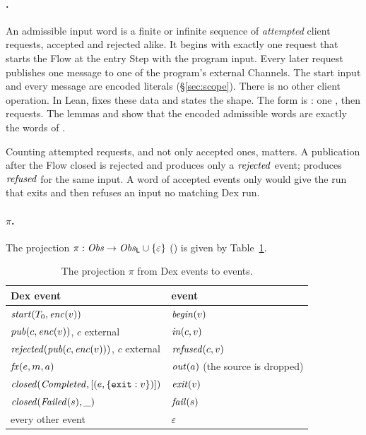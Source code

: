 \paragraph{\Eadm.}
An admissible input word is a finite or infinite sequence of
\emph{attempted} client requests, accepted and rejected alike. It begins
with exactly one request that starts the Flow at the entry Step with the
program input. Every later request publishes one message to one of the
program's external Channels. The start input and every message are encoded
\Lang{} literals (\S\ref{sec:scope}). There is no other client operation.
In Lean,  fixes these data and
 states the shape. The \Lang{} form
is : one , then  requests.
The lemmas  and 
show that the encoded admissible \Lang{} words are exactly the words of
\Eadm.

Counting attempted requests, and not only accepted ones, matters. A
publication after the Flow closed is rejected and produces only a
$\mathit{rejected}$ event; \Lang{} produces $\mathit{refused}$ for the same input.
A word of accepted events only would give the \Lang{} run that exits and
then refuses an input no matching Dex run.

\paragraph{$\pi$.}
The projection $\pi : \mathit{Obs} \to \mathit{Obs}_{\mathsf{L}} \cup \{\varepsilon\}$
() is given by Table~\ref{tab:projection}.

\begin{table}[t]
\centering
\small
\begin{tabular}{@{}ll@{}}
\toprule
Dex event & \Lang{} event \\
\midrule
$\mathit{start}(T_0, \mathit{enc}(v))$ & $\mathit{begin}(v)$ \\
$\mathit{pub}(c, \mathit{enc}(v))$, $c$ external & $\mathit{in}(c, v)$ \\
$\mathit{rejected}(\mathit{pub}(c, \mathit{enc}(v)))$, $c$ external & $\mathit{refused}(c, v)$ \\
$\mathit{fx}(e, m, a)$ & $\mathit{out}(a)$ \quad (the source is dropped) \\
$\mathit{closed}(\mathit{Completed}, [(e, \{\texttt{exit}: v\})])$ & $\mathit{exit}(v)$ \\
$\mathit{closed}(\mathit{Failed}(s), \_)$ & $\mathit{fail}(s)$ \\
every other event & $\varepsilon$ \\
\bottomrule
\end{tabular}
\caption{The projection $\pi$ from Dex events to \Lang{} events.}
\label{tab:projection}
\end{table}

